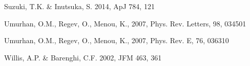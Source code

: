 \documentclass{emulateapj}
\begin{document}
\begin{thebibliography}{53}
Suzuki, T.K. \& Inutsuka, S. 2014, ApJ 784, 121

Umurhan, O.M., Regev, O., Menou, K., 2007, Phys. Rev. Letters, 98, 034501

Umurhan, O.M., Regev, O., Menou, K., 2007, Phys. Rev. E, 76, 036310

Willis, A.P. \& Barenghi, C.F. 2002, JFM 463, 361

\end{thebibliography}
\end{document}

